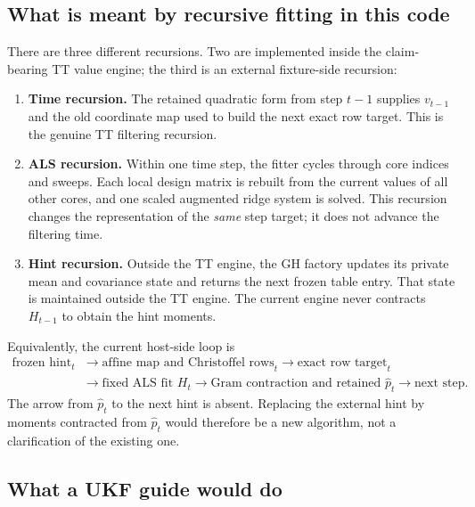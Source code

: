 \documentclass[11pt]{article}
\begin{document}
\subsection{What is meant by recursive fitting in this code}

There are three different recursions.  Two are implemented inside the
claim-bearing TT value engine; the third is an external fixture-side recursion:

\begin{enumerate}
\item \textbf{Time recursion.}  The retained quadratic form from step $t-1$
  supplies $v_{t-1}$ and the old coordinate map used to build the next exact
  row target.  This is the genuine TT filtering recursion.
\item \textbf{ALS recursion.}  Within one time step, the fitter cycles through
  core indices and sweeps.  Each local design matrix is rebuilt from the
  current values of all other cores, and one scaled augmented ridge system is
  solved.  This recursion changes the representation of the \emph{same}
  step target; it does not advance the filtering time.
\item \textbf{Hint recursion.}  Outside the TT engine, the GH factory updates its private mean and
  covariance state and returns the next frozen table entry.  That state is
  maintained outside the TT engine.  The current engine never contracts
  $H_{t-1}$ to obtain the hint moments.
\end{enumerate}

Equivalently, the current host-side loop is
\begin{equation}
\begin{split}
\text{frozen hint}_t
&\longrightarrow \text{affine map and Christoffel rows}_t
\longrightarrow \text{exact row target}_t\\
&\longrightarrow \text{fixed ALS fit }H_t
\longrightarrow \text{Gram contraction and retained }\widehat p_t
\longrightarrow \text{next step}.
\end{split}
\label{eq:actual-loop-summary}
\end{equation}
The arrow from $\widehat p_t$ to the next hint is absent.  Replacing the
external hint by moments contracted from $\widehat p_t$ would therefore be a
new algorithm, not a clarification of the existing one.

\subsection{What a UKF guide would do}
\end{document}
